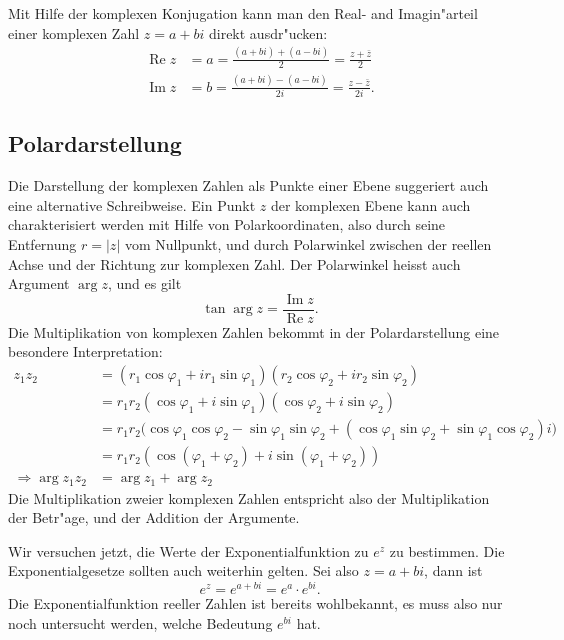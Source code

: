 Mit Hilfe der komplexen Konjugation kann man den Real- and Imagin"arteil
einer komplexen Zahl $z=a+bi$ direkt ausdr"ucken:
\begin{align}
\operatorname{Re}z 
&=
a=\frac{(a+bi)+(a-bi)}2=\frac{z+\bar z}2
\label{skript:realteil-formel}
\\
\operatorname{Im}z
&=
b=\frac{(a+bi)-(a-bi)}{2i}=\frac{z-\bar z}{2i}.
\label{skript:imaginaerteil-formel}
\end{align}

\subsection{Polardarstellung}
Die Darstellung der komplexen Zahlen als Punkte einer Ebene suggeriert
auch eine alternative Schreibweise.
Ein Punkt $z$ der komplexen Ebene kann auch charakterisiert werden mit Hilfe von
Polarkoordinaten, also durch seine Entfernung $r=|z|$ vom Nullpunkt,
und durch Polarwinkel zwischen der reellen Achse und der Richtung
zur komplexen Zahl. Der Polarwinkel heisst auch Argument $\operatorname{arg}z$,
und es gilt
\[
\tan\operatorname{arg}z=\frac{\operatorname{Im}z}{\operatorname{Re}z}.
\]
Die Multiplikation von komplexen Zahlen bekommt in der Polardarstellung
eine besondere Interpretation:
\begin{align*}
z_1z_2
&=
(r_1\cos\varphi_1+ir_1\sin\varphi_1) (r_2\cos\varphi_2+ir_2\sin\varphi_2)
\\
&=
r_1r_2(\cos\varphi_1+i\sin\varphi_1) (\cos\varphi_2+i\sin\varphi_2)
\\
&=
r_1r_2\bigl(
\cos\varphi_1\cos\varphi_2-\sin\varphi_1\sin\varphi_2 +
(\cos\varphi_1\sin\varphi_2+\sin\varphi_1\cos\varphi_2)i\bigr)
\\
&=
r_1r_2(\cos(\varphi_1+\varphi_2)+i\sin(\varphi_1+\varphi_2))
\\
\Rightarrow \operatorname{arg}z_1z_2&=\arg z_1 + \arg z_2
\end{align*}
Die Multiplikation zweier komplexen Zahlen entspricht also der
Multiplikation der Betr"age, und der Addition der Argumente.

Wir versuchen jetzt, die Werte der Exponentialfunktion zu $e^z$ zu
bestimmen.
Die Exponentialgesetze sollten auch weiterhin gelten.
Sei also $z=a+bi$, dann ist
\[
e^z=e^{a+bi}=e^a\cdot e^{bi}.
\]
Die Exponentialfunktion reeller Zahlen ist bereits wohlbekannt, es muss
also nur noch untersucht werden, welche Bedeutung $e^{bi}$ hat.

